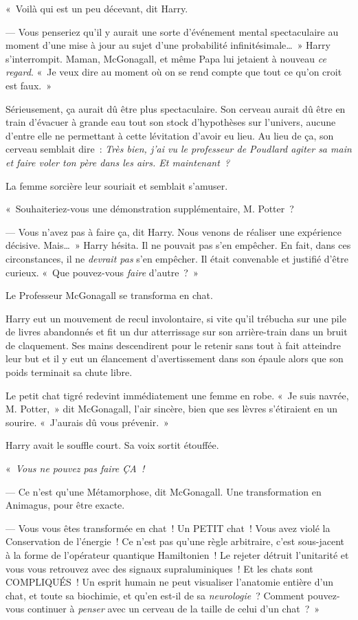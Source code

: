 «~Voilà qui est un peu décevant, dit Harry.

--- Vous penseriez qu'il y aurait une sorte d'événement mental spectaculaire au moment d'une mise à jour au sujet d'une probabilité infinitésimale…~» Harry s'interrompit. Maman, McGonagall, et même Papa lui jetaient à nouveau \emph{ce regard}. «~Je veux dire au moment où on se rend compte que tout ce qu'on croit est faux.~»

Sérieusement, ça aurait dû être plus spectaculaire. Son cerveau aurait dû être en train d'évacuer à grande eau tout son stock d'hypothèses sur l'univers, aucune d'entre elle ne permettant à cette lévitation d'avoir eu lieu. Au lieu de ça, son cerveau semblait dire~: \emph{Très bien, j'ai vu le professeur de Poudlard agiter sa main et faire voler ton père dans les airs. Et maintenant~?}

La femme sorcière leur souriait et semblait s'amuser.

«~Souhaiteriez-vous une démonstration supplémentaire, M. Potter~?

--- Vous n'avez pas à faire ça, dit Harry. Nous venons de réaliser une expérience décisive. Mais…~» Harry hésita. Il ne pouvait pas s'en empêcher. En fait, dans ces circonstances, il ne \emph{devrait pas} s'en empêcher. Il était convenable et justifié d'être curieux. «~Que pouvez-vous \emph{faire} d'autre~?~»

Le Professeur McGonagall se transforma en chat.

Harry eut un mouvement de recul involontaire, si vite qu'il trébucha sur une pile de livres abandonnés et fit un dur atterrissage sur son arrière-train dans un bruit de claquement. Ses mains descendirent pour le retenir sans tout à fait atteindre leur but et il y eut un élancement d'avertissement dans son épaule alors que son poids terminait sa chute libre.

Le petit chat tigré redevint immédiatement une femme en robe. «~Je suis navrée, M. Potter,~» dit McGonagall, l'air sincère, bien que ses lèvres s'étiraient en un sourire. «~J'aurais dû vous prévenir.~»

Harry avait le souffle court. Sa voix sortit étouffée.

«~\emph{Vous ne pouvez pas faire ÇA~!}

--- Ce n'est qu'une Métamorphose, dit McGonagall. Une transformation en Animagus, pour être exacte.

--- Vous vous êtes transformée en chat~! Un PETIT chat~! Vous avez violé la Conservation de l'énergie~! Ce n'est pas qu'une règle arbitraire, c'est sous-jacent à la forme de l'opérateur quantique Hamiltonien~! Le rejeter détruit l'unitarité et vous vous retrouvez avec des signaux supraluminiques~! Et les chats sont COMPLIQUÉS~! Un esprit humain ne peut visualiser l'anatomie entière d'un chat, et toute sa biochimie, et qu'en est-il de sa \emph{neurologie}~? Comment pouvez-vous continuer à \emph{penser} avec un cerveau de la taille de celui d'un chat~?~»

